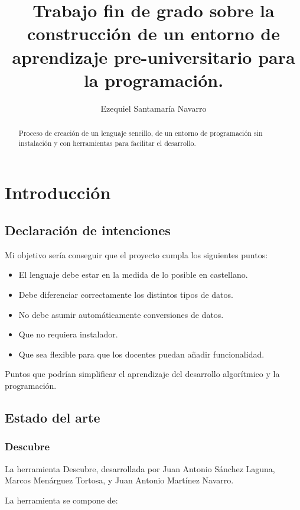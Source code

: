 \documentclass{report}
\author{Ezequiel Santamaría Navarro}
\title{Trabajo fin de grado sobre la construcción de un entorno de aprendizaje pre-universitario para la programación.}
\begin{document}
\maketitle
\tableofcontents
	
\begin{abstract}
	Proceso de creación de un lenguaje sencillo, de un entorno de programación sin instalación y con herramientas para facilitar el desarrollo.
\end{abstract}


\chapter{Introducción}

\section{Declaración de intenciones}

Mi objetivo sería conseguir que el proyecto cumpla los siguientes puntos:

\begin{itemize}
	\item El lenguaje debe estar en la medida de lo posible en castellano.
	\item Debe diferenciar correctamente los distintos tipos de datos.
	\item No debe asumir automáticamente conversiones de datos.
	\item Que no requiera instalador.
	\item Que sea flexible para que los docentes puedan añadir funcionalidad.
\end{itemize} 

Puntos que podrían simplificar el aprendizaje del desarrollo algorítmico y la programación.

\section{Estado del arte}

\subsection{Descubre}

La herramienta Descubre, desarrollada por Juan Antonio Sánchez Laguna, Marcos Menárguez Tortosa, y Juan Antonio Martínez Navarro. 

La herramienta se compone de:

\end{document}
